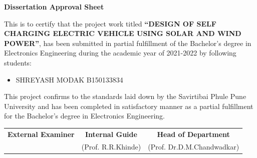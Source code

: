 \documentclass[a4paper,12pt]{article}
\begin{document}
\newpage
\thispagestyle{empty}
\begin{center}
\Large\textbf{Dissertation Approval Sheet}\\[1cm]
\end{center}
\large This is to certify that the project work titled \textbf{“DESIGN OF SELF CHARGING ELECTRIC VEHICLE USING SOLAR AND WIND POWER”}, has been submitted in partial fulfillment of the Bachelor’s degree in Electronics Engineering during the academic year of 2021-2022 by following students:\\[2cm]
\begin{itemize}
\item SHREYASH MODAK {B150133834}\\[2cm]

\end{itemize}
\large This project confirms to the standards laid down by the Savirtibai Phule Pune University and has been completed in satisfactory manner as a partial fulfillment for the Bachelor’s degree in Electronics Engineering.\\[2in]
\begin{tabular}{c c c}
\textbf{External Examiner} & \hspace{0.15cm} \textbf{Internal Guide} & \hspace{0.15cm} \textbf{Head of Department}\\

               & \hspace{0.9cm}(Prof. R.R.Khinde)  & \hspace{1cm}(Prof. Dr.D.M.Chandwadkar)\\
\end{tabular}\\

\end{document}
